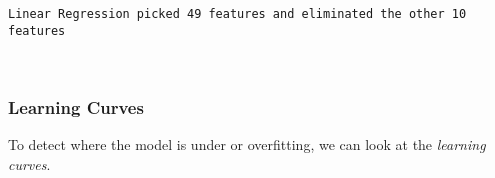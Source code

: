 \documentclass[11pt]{article}
\begin{document}
    \begin{center}
    \end{center}
    { \hspace*{\fill} \\}
    
    \begin{center}
    \end{center}
    { \hspace*{\fill} \\}
    
    \begin{Verbatim}[commandchars=\\\{\}]
Linear Regression picked 49 features and eliminated the other 10 features
    \end{Verbatim}

    \begin{center}
    \end{center}
    { \hspace*{\fill} \\}
    
    \hypertarget{learning-curves}{%
\subsubsection{Learning Curves}\label{learning-curves}}

To detect where the model is under or overfitting, we can look at the
\emph{learning curves}.
\end{document}

